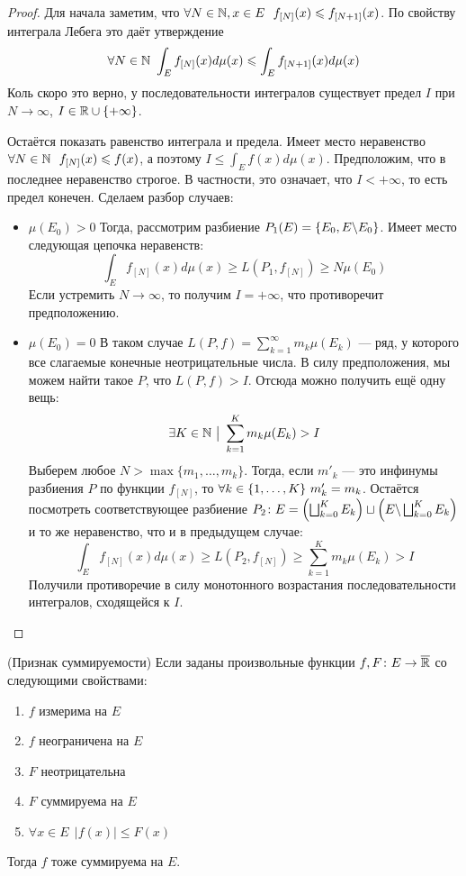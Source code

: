 \begin{proof}
	Для начала заметим, что $\forall N \in \mathbb{N}, x \in E\ \ f_{[N]}(x) \leqslant f_{[N + 1]}(x)$. По свойству интеграла Лебега это даёт утверждение
	\[
		\forall N \in \mathbb{N}\ \int_E f_{[N]}(x)d\mu(x) \leqslant \int_E f_{[N + 1]}(x)d\mu(x)
	\]
	Коль скоро это верно, у последовательности интегралов существует предел $I$ при $N \to \infty$, $I \in \mathbb{R} \cup \{+\infty\}$.
	
	Остаётся показать равенство интеграла и предела. Имеет место неравенство $\forall N \in \mathbb{N}\ \  f_{[N]}(x) \leqslant f(x)$, а поэтому $I \le \int_E f(x)d\mu(x)$. Предположим, что в последнее неравенство строгое. В частности, это означает, что $I < +\infty$, то есть предел конечен. Сделаем разбор случаев:
	\begin{itemize}
		\item $\mu(E_0) > 0$ Тогда, рассмотрим разбиение $P_1(E) = \{E_0, E \backslash E_0\}$. Имеет место следующая цепочка неравенств:
		\[
			\int_E f_{[N]}(x)d\mu(x) \ge L(P_1, f_{[N]}) \ge N\mu(E_0)
		\]
		Если устремить $N \to \infty$, то получим $I = +\infty$, что противоречит предположению.
		
		\item $\mu(E_0) = 0$ В таком случае $L(P, f) = \sum_{k = 1}^\infty m_k \mu(E_k)$ --- ряд, у которого все слагаемые конечные неотрицательные числа. В силу предположения, мы можем найти такое $P$, что $L(P, f) > I$. Отсюда можно получить ещё одну вещь:
		\[
			\exists K \in \mathbb{N} \ \big|\  \sum_{k = 1}^K m_k \mu(E_k) > I
		\]
		Выберем любое $N > \max \{m_1, \ldots, m_k\}$. Тогда, если $m'_k$ --- это инфинумы разбиения $P$ по функции $f_{[N]}$, то $\forall k \in \{1, \ldots, K\}\ m'_k = m_k$. Остаётся посмотреть соответствующее разбиение $P_2 \colon E = \left(\bigsqcup_{k = 0}^K E_k\right) \sqcup \left(E \backslash \bigsqcup_{k = 0}^K E_k\right)$ и то же неравенство, что и в предыдущем случае:
		\[
			\int_E f_{[N]}(x)d\mu(x) \ge L(P_2, f_{[N]}) \ge \sum_{k = 1}^K m_k \mu(E_k) > I
		\]
		Получили противоречие в силу монотонного возрастания последовательности интегралов, сходящейся к $I$.
	\end{itemize}
\end{proof}

\begin{lemma} (Признак суммируемости)
	Если заданы произвольные функции $f, F \colon E \to \overline{\mathbb{R}}$ со следующими свойствами:
	\begin{enumerate}
		\item $f$ измерима на $E$
		
		\item $f$ неограничена на $E$
		
		\item $F$ неотрицательна
		
		\item $F$ суммируема на $E$
		
		\item $\forall x \in E\ \ |f(x)| \le F(x)$
	\end{enumerate}
	Тогда $f$ тоже суммируема на $E$.
\end{lemma}

